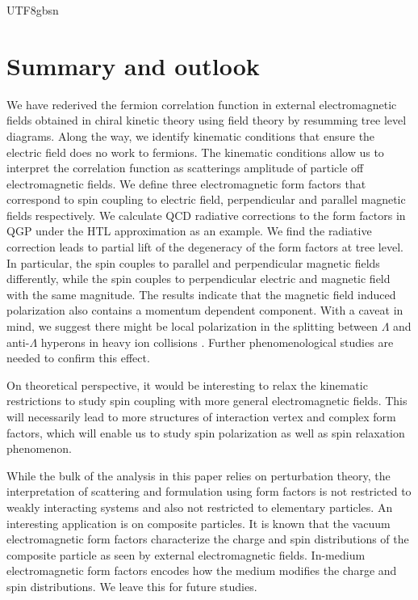 \documentclass[11pt]{article}\def\baselinestretch{1.4}
\def\L{{\Lambda}}
\begin{document}
\begin{CJK}{UTF8}{gbsn}


\section{Summary and outlook}\label{sec_outlook}

We have rederived the fermion correlation function in external electromagnetic fields obtained in chiral kinetic theory using field theory by resumming tree level diagrams. Along the way, we identify kinematic conditions that ensure the electric field does no work to fermions. The kinematic conditions allow us to interpret the correlation function as scatterings amplitude of particle off electromagnetic fields. We define three electromagnetic form factors that correspond to spin coupling to electric field, perpendicular and parallel magnetic fields respectively. We calculate QCD radiative corrections to the form factors in QGP under the HTL approximation as an example. We find the radiative correction leads to partial lift of the degeneracy of the form factors at tree level. In particular, the spin couples to parallel and perpendicular magnetic fields differently, while the spin couples to perpendicular electric and magnetic field with the same magnitude. The results indicate that the magnetic field induced polarization also contains a momentum dependent component. With a caveat in mind, we suggest there might be local polarization in the splitting between $\L$ and anti-$\L$ hyperons in heavy ion collisions \cite{Becattini:2016gvu}. Further phenomenological studies are needed to confirm this effect.

On theoretical perspective, it would be interesting to relax the kinematic restrictions to study spin coupling with more general electromagnetic fields. This will necessarily lead to more structures of interaction vertex and complex form factors, which will enable us to study spin polarization as well as spin relaxation phenomenon.

While the bulk of the analysis in this paper relies on perturbation theory, the interpretation of scattering and formulation using form factors is not restricted to weakly interacting systems and also not restricted to elementary particles. An interesting application is on composite particles. It is known that the vacuum electromagnetic form factors characterize the charge and spin distributions of the composite particle as seen by external electromagnetic fields. In-medium electromagnetic form factors encodes how the medium modifies the charge and spin distributions. We leave this for future studies.




\end{CJK}
\end{document}
